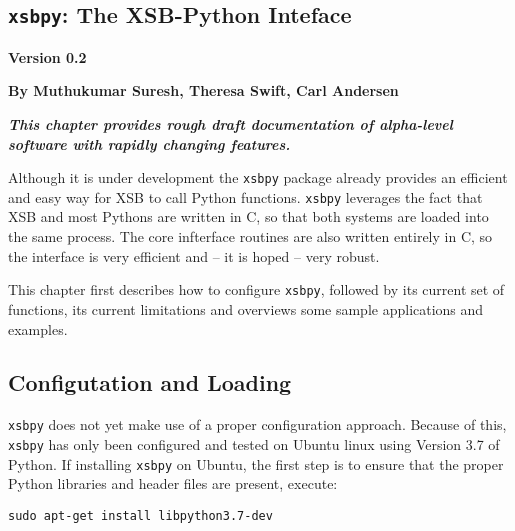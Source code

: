 \newcommand{\xsbpyversion}{Version 0.2}

\begin{center}
\chapter[XSB and Python]{{\tt xsbpy}: The XSB-Python Inteface} \label{chap:xsbpy}
\end{center}

\vspace*{-.30in} 
\begin{center}
{\Large {\bf  \xsbpyversion}}
\end{center}

\begin{center}
  {\Large {\bf By Muthukumar Suresh, Theresa Swift, Carl Andersen}}
\end{center}

\noindent
{\large {\bf {\em This chapter provides rough draft documentation of
      alpha-level software with rapidly changing features.}}}

%

Although it is under development the {\tt xsbpy} package already
provides an efficient and easy way for XSB to call Python functions.
{\tt xsbpy} leverages the fact that XSB and most Pythons are written
in C, so that both systems are loaded into the same process. The core
infterface routines are also written entirely in C, so the interface
is very efficient and -- it is hoped -- very robust.

This chapter first describes how to configure {\tt xsbpy}, followed by
its current set of functions, its current limitations and overviews
some sample applications and examples.

\section{Configutation and Loading}

{\tt xsbpy} does not yet make use of a proper configuration approach.
Because of this, {\tt xsbpy} has only been configured and tested on
Ubuntu linux using Version 3.7 of Python.  If installing {\tt xsbpy}
on Ubuntu, the first step is to ensure that the proper Python
libraries and header files are present, execute:

{\tt sudo apt-get install libpython3.7-dev}



